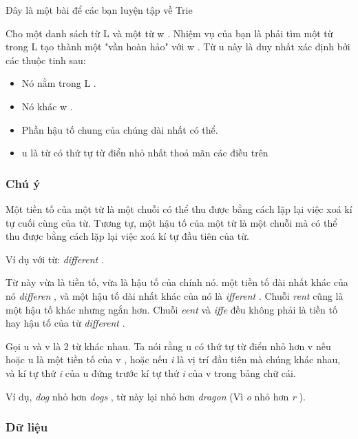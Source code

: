 

       Đây là một bài để các bạn luyện tập về Trie     

   Cho một danh sách từ       L      và một từ       w      . Nhiệm vụ của bạn là phải tìm một từ trong       L      tạo thành một "vần hoàn hảo" với       w      . Từ       u      này là duy nhất xác định bởi các thuộc tinh sau:  
\begin{itemize}
	\item      Nó nằm trong           L          .    
	\item      Nó khác           w          .    
	\item      Phần hậu tố chung của chúng dài nhất có thể.    
	\item            u          là từ có thứ tự từ điển nhỏ nhất thoả mãn các điều trên    
\end{itemize}

\subsubsection{   Chú ý  }

   Một tiền tố của một từ là một chuỗi có thể thu được bằng cách lặp lại việc xoá kí tự cuối cùng của từ. Tương tự, một hậu tố của một từ là một chuỗi mà có thể thu được bằng cách lặp lại việc xoá kí tự đầu tiên của từ.  

   Ví dụ với từ:   \textit{    different   }   .  

   Từ này vừa là tiền tố, vừa là hậu tố của chính nó. một tiền tố dài nhất khác của nó   \textit{    differen   }   , và một hậu tố dài nhất khác của nó là   \textit{    ifferent   }   . Chuỗi   \textit{    rent   }   cũng là một hậu tố khác nhưng ngắn hơn. Chuỗi   \textit{    eent   }   và   \textit{    iffe   }   đều không phải là tiền tố hay hậu tố của từ   \textit{    different   }   .  

   Gọi       u      và       v      là 2 từ khác nhau. Ta nói rằng       u      có thứ tự từ điển nhỏ hơn       v      nếu hoặc       u      là một tiền tố của       v      , hoặc nếu   \textit{    i   }   là vị trí đầu tiên mà chúng khác nhau, và kí tự thứ   \textit{    i   }   của       u      đứng trước kí tự thứ   \textit{    i   }   của       v      trong bảng chữ cái.  

   Ví dụ,   \textit{    dog   }   nhỏ hơn   \textit{    dogs   }   , từ này lại nhỏ hơn   \textit{    dragon   }   (Vì   \textit{    o   }   nhỏ hơn   \textit{    r   }   ).  

\subsubsection{   Dữ liệu  }

